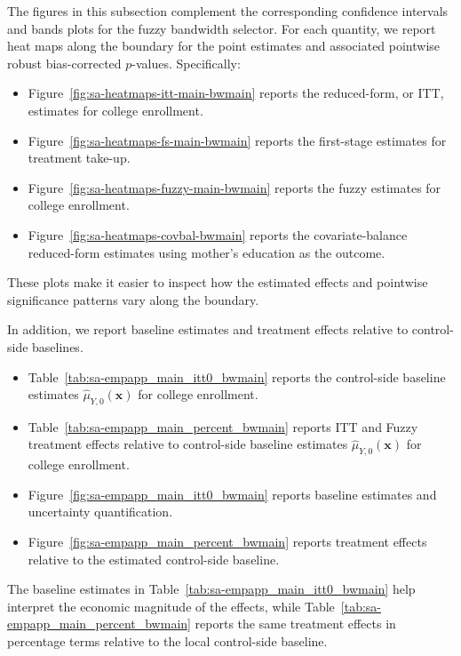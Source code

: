 \documentclass[10pt]{article}
\newcommand{\bx}{\mathbf{x}}
\begin{document}
The figures in this subsection complement the corresponding confidence intervals and bands plots for the fuzzy bandwidth selector. For each quantity, we report heat maps along the boundary for the point estimates and associated pointwise robust bias-corrected $p$-values. Specifically:
\begin{itemize}
    \item Figure~\ref{fig:sa-heatmaps-itt-main-bwmain} reports the reduced-form, or ITT, estimates for college enrollment.
    \item Figure~\ref{fig:sa-heatmaps-fs-main-bwmain} reports the first-stage estimates for treatment take-up.
    \item Figure~\ref{fig:sa-heatmaps-fuzzy-main-bwmain} reports the fuzzy estimates for college enrollment.
    \item Figure~\ref{fig:sa-heatmaps-covbal-bwmain} reports the covariate-balance reduced-form estimates using mother's education as the outcome.
\end{itemize}
These plots make it easier to inspect how the estimated effects and pointwise significance patterns vary along the boundary.

In addition, we report baseline estimates and treatment effects relative to control-side baselines.
\begin{itemize}
    \item Table~\ref{tab:sa-empapp_main_itt0_bwmain} reports the control-side baseline estimates $\widehat{\mu}_{Y,0}(\bx)$ for college enrollment.
    \item Table~\ref{tab:sa-empapp_main_percent_bwmain} reports ITT and Fuzzy treatment effects relative to control-side baseline estimates $\widehat{\mu}_{Y,0}(\bx)$ for college enrollment.
    \item Figure~\ref{fig:sa-empapp_main_itt0_bwmain} reports baseline estimates and uncertainty quantification.
    \item Figure~\ref{fig:sa-empapp_main_percent_bwmain} reports treatment effects relative to the estimated control-side baseline.
\end{itemize}
The baseline estimates in Table~\ref{tab:sa-empapp_main_itt0_bwmain} help interpret the economic magnitude of the effects, while Table~\ref{tab:sa-empapp_main_percent_bwmain} reports the same treatment effects in percentage terms relative to the local control-side baseline.

\clearpage
\end{document}
